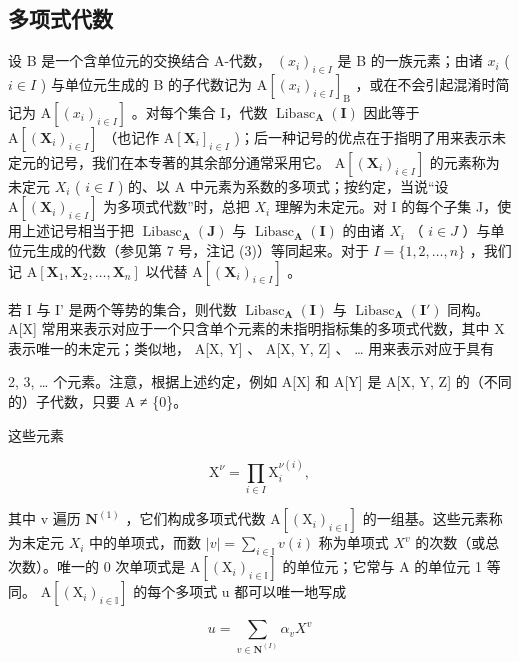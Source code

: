 \subsection{多项式代数}

设 B 是一个含单位元的交换结合 A-代数， \((x_{i})_{i\in I}\) 是 B 的一族元素；由诸 \(x_{i}\) ( \(i\in I\) ) 与单位元生成的 B 的子代数记为 \(\mathrm{A}[(x_{i})_{i\in I}]_{\mathrm{B}}\) ，或在不会引起混淆时简记为 \(\mathrm{A}[(x_{i})_{i\in I}]\) 。对每个集合 I，代数 \(\operatorname{Libasc}_{\mathbf{A}}(\mathbf{I})\) 因此等于 \(\mathrm{A}[(\mathbf{X}_{i})_{i\in I}]\) （也记作 \(\mathrm{A}[\mathbf{X}_{i}]_{i\in I}\) )；后一种记号的优点在于指明了用来表示未定元的记号，我们在本专著的其余部分通常采用它。 \(\mathrm{A}[(\mathbf{X}_{i})_{i\in I}]\) 的元素称为未定元 \(X_{i}\) ( \(i\in I\) ) 的、以 A 中元素为系数的多项式；按约定，当说“设 \(\mathrm{A}[(\mathbf{X}_{i})_{i\in I}]\) 为多项式代数”时，总把 \(X_{i}\) 理解为未定元。对 I 的每个子集 J，使用上述记号相当于把 \(\operatorname{Libasc}_{\mathbf{A}}(\mathbf{J})\) 与 \(\operatorname{Libasc}_{\mathbf{A}}(\mathbf{I})\) 的由诸 \(X_{i}\) （ \(i\in J\) ）与单位元生成的代数（参见第 7 号，注记 (3)）等同起来。对于 \(I=\{1,2,\ldots,n\}\) ，我们记 \(\mathrm{A}[\mathbf{X}_{1},\mathbf{X}_{2},\ldots,\mathbf{X}_{n}]\) 以代替 \(\mathrm{A}[(\mathbf{X}_{i})_{i\in I}]\) 。

若 I 与 I' 是两个等势的集合，则代数 \(\operatorname{Libasc}_{\mathbf{A}}(\mathbf{I})\) 与 \(\operatorname{Libasc}_{\mathbf{A}}(\mathbf{I}')\) 同构。 A{[}X{]} 常用来表示对应于一个只含单个元素的未指明指标集的多项式代数，其中 X 表示唯一的未定元；类似地， A{[}X, Y{]} 、 A{[}X, Y, Z{]} 、 \ldots{} 用来表示对应于具有

2, 3, \ldots{} 个元素。注意，根据上述约定，例如 A{[}X{]} 和 A{[}Y{]} 是 A{[}X, Y, Z{]} 的（不同的）子代数，只要 A ≠ \{0\}。

这些元素

\[
\mathrm{X} ^ {\nu} = \prod_ {i \in I} \mathrm{X} _ {i} ^ {\nu (i)},
\]

其中 v 遍历 \(\mathbf{N}^{(1)}\) ，它们构成多项式代数 \(\mathrm{A}[(\mathrm{X}_{i})_{i\in\mathbb{I}}]\) 的一组基。这些元素称为未定元 \(X_{i}\) 中的单项式，而数 \(|v|=\sum_{i\in\mathbb{I}}v(i)\) 称为单项式 \(X^{v}\) 的次数（或总次数）。唯一的 0 次单项式是 \(\mathrm{A}[(\mathrm{X}_{i})_{i\in\mathbb{I}}]\) 的单位元；它常与 A 的单位元 1 等同。 \(\mathrm{A}[(\mathrm{X}_{i})_{i\in\mathbb{I}}]\) 的每个多项式 u 都可以唯一地写成

\[
u = \sum_ {v \in \mathbf {N} ^ {(I)}} \alpha_ {v} X ^ {v}
\]

